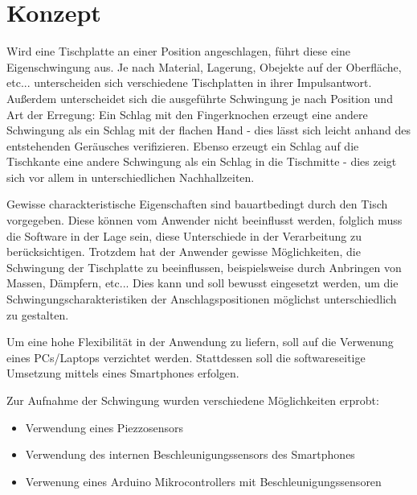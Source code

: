 \section{Konzept}

Wird eine Tischplatte an einer Position angeschlagen, führt diese eine Eigenschwingung aus.
Je nach Material, Lagerung, Obejekte auf der Oberfläche, etc... unterscheiden sich verschiedene Tischplatten in ihrer Impulsantwort.
Außerdem unterscheidet sich die ausgeführte Schwingung je nach Position und Art der Erregung: 
Ein Schlag mit den Fingerknochen erzeugt eine andere Schwingung als ein Schlag mit der flachen Hand - dies lässt sich leicht anhand des entstehenden Geräusches verifizieren.
Ebenso erzeugt ein Schlag auf die Tischkante eine andere Schwingung als ein Schlag in die Tischmitte - dies zeigt sich vor allem in unterschiedlichen Nachhallzeiten.

Gewisse charackteristische Eigenschaften sind bauartbedingt durch den Tisch vorgegeben. 
Diese können vom Anwender nicht beeinflusst werden, folglich muss die Software in der Lage sein, diese Unterschiede in der Verarbeitung zu berücksichtigen. 
Trotzdem hat der Anwender gewisse Möglichkeiten, die Schwingung der Tischplatte zu beeinflussen, beispielsweise durch Anbringen von Massen, Dämpfern, etc... 
Dies kann und soll bewusst eingesetzt werden, um die Schwingungscharakteristiken der Anschlagspositionen möglichst unterschiedlich zu gestalten.  

Um eine hohe Flexibilität in der Anwendung zu liefern, soll auf die Verwenung eines PCs/Laptops verzichtet werden. Stattdessen soll die softwareseitige Umsetzung mittels eines Smartphones erfolgen.

Zur Aufnahme der Schwingung wurden verschiedene Möglichkeiten erprobt:
\begin{itemize}
	\item Verwendung eines Piezzosensors
	\item Verwendung des internen Beschleunigungssensors des Smartphones
	\item Verwenung eines Arduino Mikrocontrollers mit Beschleunigungssensoren  
\end{itemize}


